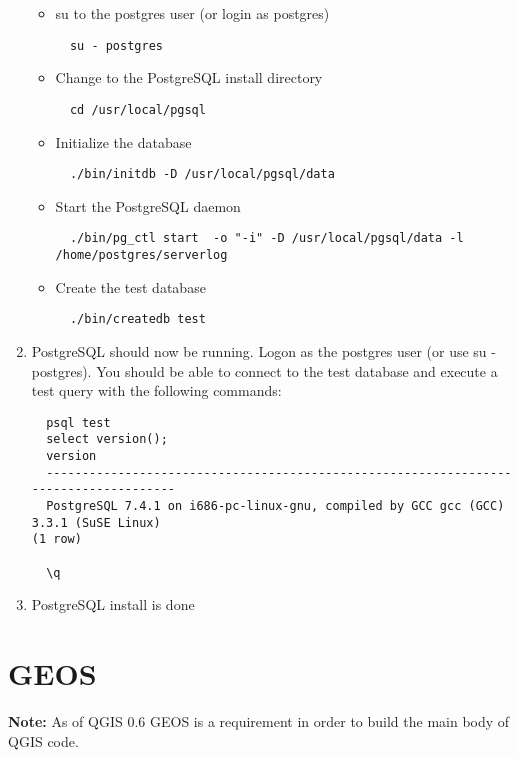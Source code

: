 \begin{enumerate}
\begin{itemize}
\item su to the postgres user (or login as postgres)
  \begin{verbatim}
  su - postgres
  \end{verbatim}

  \item Change to the PostgreSQL install directory 
  \begin{verbatim}
  cd /usr/local/pgsql
  \end{verbatim}

  \item Initialize the database 
  \begin{verbatim}
  ./bin/initdb -D /usr/local/pgsql/data
  \end{verbatim}

  \item Start the PostgreSQL daemon 
  \small
  \begin{verbatim}
  ./bin/pg_ctl start  -o "-i" -D /usr/local/pgsql/data -l /home/postgres/serverlog 
  \end{verbatim} 
  
  \item Create the test database
  
  \begin{verbatim}
  ./bin/createdb test
  \end{verbatim}
  \normalsize
  \end{itemize}
  \item PostgreSQL should now be running. Logon as the postgres user (or use su - postgres). You should be able to connect to the test database and execute a test query with the following commands: 

  \begin{verbatim}
  psql test
  select version();
  version
  -------------------------------------------------------------------------------------
  PostgreSQL 7.4.1 on i686-pc-linux-gnu, compiled by GCC gcc (GCC) 3.3.1 (SuSE Linux)
(1 row)

  \q
  \end{verbatim}


  \item PostgreSQL install is done
  \end{enumerate}

  \section{GEOS}

  \textbf{Note:} As of QGIS 0.6 GEOS is a requirement in order to build the main body of QGIS code.
  
